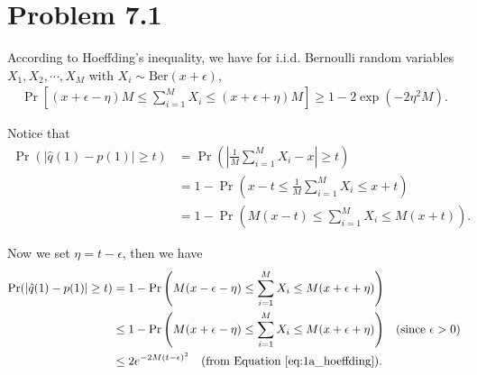 \documentclass{article}
\newcommand{\qeds}{\hfill\qedsymbol}
\begin{document}
\section*{Problem 7.1}
According to Hoeffding's inequality, we have for i.i.d. Bernoulli random variables $X_1, X_2, \cdots, X_M$ with $X_i \sim \text{Ber}(x + \epsilon)$,
\begin{align}
	\Pr\left[ (x + \epsilon - \eta)M \leq \sum_{i=1}^M X_i \leq (x + \epsilon + \eta)M \right] \geq 1 - 2\exp(-2\eta^2 M). \label{eq:1a_hoeffding}
\end{align}

Notice that
\begin{align*}
	\Pr(|\hat{q}(1) - p(1)| \geq t) &= \Pr\left(\left|\frac{1}{M}\sum_{i=1}^M X_i - x\right| \geq t\right) \\
	&= 1 - \Pr\left(x - t \leq \frac{1}{M}\sum_{i=1}^M X_i \leq x + t\right) \\
	&= 1 - \Pr\left(M(x - t) \leq \sum_{i=1}^M X_i \leq M(x + t)\right).
\end{align*}

Now we set $\eta = t - \epsilon$, then we have
\begin{align*}
	\Pr(|\hat{q}(1) - p(1)| \geq t) &= 1 - \Pr\left(M(x - \epsilon - \eta) \leq \sum_{i=1}^M X_i \leq M(x + \epsilon + \eta)\right) \\
	&\leq 1 - \Pr\left(M(x + \epsilon - \eta) \leq \sum_{i=1}^M X_i \leq M(x + \epsilon + \eta)\right) \;\;\; \text{(since $\epsilon > 0$)} \\
	&\leq 2e^{-2M(t-\epsilon)^2} \quad \text{(from Equation \ref{eq:1a_hoeffding})}.
\end{align*} \qeds

%
\end{document}
